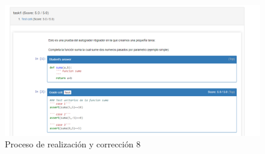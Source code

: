 \begin{enumerate}
\begin{figure}[H]
    \centering
    \includegraphics[width=1\textwidth]{img/prueba/prueba_21.png}
    \caption{Proceso de realización y corrección 8}
\end{figure}
\end{enumerate}

